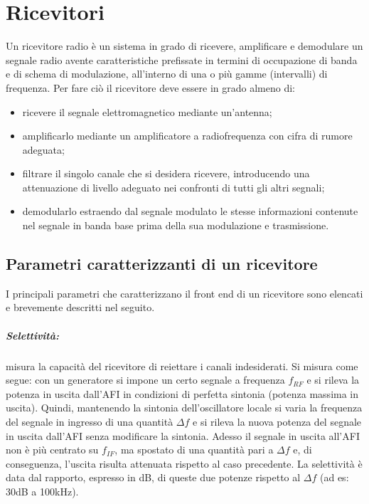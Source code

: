 \chapter{Ricevitori}

Un ricevitore radio è un sistema in grado di ricevere, amplificare e demodulare un segnale radio
avente caratteristiche prefissate in termini di occupazione di banda e di schema di modulazione, all'interno di una o più gamme (intervalli) di frequenza. Per fare ciò il ricevitore deve essere in
grado almeno di:
\begin{itemize}
	\item ricevere il segnale elettromagnetico mediante un'antenna;
	\item amplificarlo mediante un amplificatore a radiofrequenza con cifra di rumore adeguata;
	\item filtrare il singolo canale che si desidera ricevere, introducendo una attenuazione di livello
	adeguato nei confronti di tutti gli altri segnali;
	\item demodularlo estraendo dal segnale modulato le stesse informazioni contenute nel segnale in
	banda base prima della sua modulazione e trasmissione.
\end{itemize}

\section{Parametri caratterizzanti di un ricevitore}
I principali parametri che caratterizzano il front end di un ricevitore sono elencati e brevemente
descritti nel seguito.
\paragraph{Selettività:} misura la capacità del ricevitore di reiettare i canali indesiderati.
Si misura come segue: con un generatore si impone un certo segnale a frequenza $f_{RF}$ e si rileva la
potenza in uscita dall'AFI in condizioni di perfetta sintonia (potenza massima in uscita).
Quindi, mantenendo la sintonia dell'oscillatore locale si varia la frequenza del segnale in ingresso di
una quantità $\Delta f$ e si rileva la nuova potenza del segnale in uscita dall'AFI senza modificare la
sintonia. Adesso il segnale in uscita all'AFI non è più centrato su $f_{IF}$, ma spostato di una quantità
pari a $\Delta f$ e, di conseguenza, l'uscita risulta attenuata rispetto al caso precedente.
La selettività è data dal rapporto, espresso in dB, di queste due potenze rispetto al $\Delta f$ (ad es: 30dB a
100kHz).
